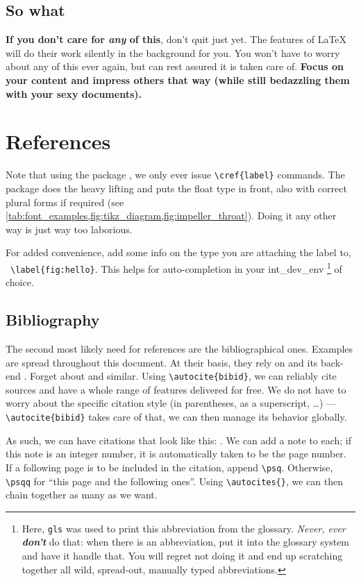 \subsection*{So what}
\textbf{If you don't care for \textit{any} of this}, don't quit just yet.
The features of \LaTeX{} will do their work silently in the background for you.
You won't have to worry about any of this ever again, but can rest assured it is taken care of.
\textbf{Focus on your content and impress others that way (while still bedazzling them with your sexy documents).}
\section{References}
Note that using the package , we only ever issue \verb|\cref{label}| commands.
The package does the heavy lifting and puts the float type in front, also with correct plural forms if required (see \cref{tab:font_examples,fig:tikz_diagram,fig:impeller_throat}).
Doing it any other way is just way too laborious.

For added convenience, add some info on the type you are attaching the label to, \ \verb|\label{fig:hello}|.
This helps for auto-completion in your \gls{int_dev_env}%
\footnote{%
	Here, \texttt{gls} was used to print this abbreviation from the glossary.
	\textit{Never, ever \textbf{don't}} do that: when there is an abbreviation, put it into the glossary system and have it handle that.
	You will regret not doing it and end up scratching together all wild, spread-out, manually typed abbreviations.}
of choice.

\subsection{Bibliography}
The second most likely need for references are the bibliographical ones.
Examples are spread throughout this document.
At their basis, they rely on  and its back-end .
Forget about  and similar.
Using \verb|\autocite{bibid}|, we can reliably cite sources and have a whole range of features delivered for free.
We do not have to worry about the specific citation style (in parentheses, as a superscript, \dots) --- \verb|\autocite{bibid}| takes care of that, we can then manage its behavior globally.

As such, we can have citations that look like this: \autocites[23]{dixon_fluid_2014}[29\psqq]{aungier_centrifugal_2000}[2-9]{japikse_assessment_1985}[89\psq]{kurzke_correlations_2011}{pampreen_jet-wake_1982}.
We can add a note to each; if this note is an integer number, it is automatically taken to be the page number.
If a following page is to be included in the citation, append \verb|\psq|.
Otherwise, \verb|\psqq| for \enquote{this page and the following ones}.
Using \verb|\autocites{}|, we can then chain together as many as we want.

